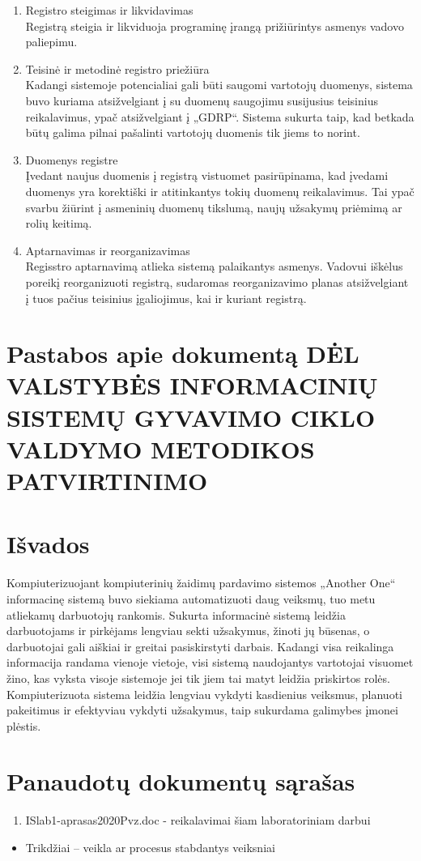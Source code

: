 \documentclass{VUMIFPSkursinis}
\begin{document}
\begin{enumerate}
    \item Registro steigimas ir likvidavimas\\
    Registrą steigia ir likviduoja programinę įrangą prižiūrintys asmenys vadovo paliepimu.
    \item Teisinė ir metodinė registro priežiūra\\
    Kadangi sistemoje potencialiai gali būti saugomi vartotojų duomenys, sistema buvo kuriama atsižvelgiant į su duomenų saugojimu susijusius teisinius reikalavimus, ypač atsižvelgiant į „GDRP“. Sistema sukurta taip, kad betkada būtų galima pilnai pašalinti vartotojų duomenis tik jiems to norint.
    \item Duomenys registre \\
    Įvedant naujus duomenis į registrą vistuomet pasirūpinama, kad įvedami duomenys yra korektiški ir atitinkantys tokių duomenų reikalavimus. Tai ypač svarbu žiūrint į asmeninių duomenų tikslumą, naujų užsakymų priėmimą ar rolių keitimą.
    \item Aptarnavimas ir reorganizavimas\\
    Regisstro aptarnavimą atlieka sistemą palaikantys asmenys. Vadovui iškėlus poreikį reorganizuoti registrą, sudaromas reorganizavimo planas atsižvelgiant į tuos pačius teisinius įgaliojimus, kai ir kuriant registrą.
\end{enumerate}

\newpage
\section{Pastabos apie dokumentą DĖL VALSTYBĖS INFORMACINIŲ SISTEMŲ GYVAVIMO CIKLO VALDYMO METODIKOS PATVIRTINIMO}

\newpage

\section{Išvados}
Kompiuterizuojant kompiuterinių žaidimų pardavimo sistemos „Another One“ informacinę sistemą buvo siekiama automatizuoti daug veiksmų, tuo metu atliekamų darbuotojų rankomis. Sukurta informacinė sistemą leidžia darbuotojams ir pirkėjams lengviau sekti užsakymus, žinoti jų būsenas, o darbuotojai gali aiškiai ir greitai pasiskirstyti darbais. Kadangi visa reikalinga informacija randama vienoje vietoje, visi sistemą naudojantys vartotojai visuomet žino, kas vyksta visoje sistemoje jei tik jiem tai matyt leidžia priskirtos rolės. Kompiuterizuota sistema leidžia lengviau vykdyti kasdienius veiksmus, planuoti pakeitimus ir efektyviau vykdyti užsakymus, taip sukurdama galimybes įmonei plėstis.

\section{Panaudotų dokumentų sąrašas}
\begin{enumerate}
    \item ISlab1-aprasas2020Pvz.doc - reikalavimai šiam laboratoriniam darbui
\end{enumerate}

\newpage
{}
\begin{itemize}
	\item{Trikdžiai -- veikla ar procesus stabdantys veiksniai}
\end{itemize}
\end{document}
